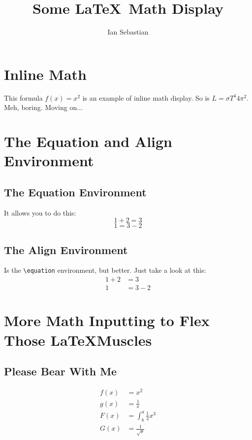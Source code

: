 \documentclass{article}
\title{Some \LaTeX \, Math Display}
\author{Ian Sebastian}
\begin{document}
	\maketitle
	
	\section{Inline Math}
	This formula $f(x) = x^2$ is an example of inline math display. So is $L = \sigma T^4 4\pi^2$. Meh, boring. Moving on...
	
	
	\section{The Equation and Align Environment}
	
	\subsection{The Equation Environment}
	It allows you to do this:
	\begin{equation*}
		1 + 2 = 3
	\end{equation*}
	\begin{equation*}
		1 = 3 - 2
	\end{equation*}
	
	\subsection{The Align Environment}
	Is the {\tt \textbackslash equation} environment, but better. Just take a look at this:
	\begin{align*}
		1 + 2 &= 3 \\
		1 &= 3 - 2
	\end{align*}
	
	
	\section{More Math Inputting to Flex Those \LaTeX Muscles}
	\subsection{Please Bear With Me}
	\begin{align*}
		f(x) &= x^2 						 \\
		g(x) &= \frac{1}{x} 				 \\
		F(x) &= \int^{a}_{b} \frac{1}{3} x^3 \\
		G(x) &= \frac{1}{\sqrt{x}}			 \\
	\end{align*}
	
\end{document}
